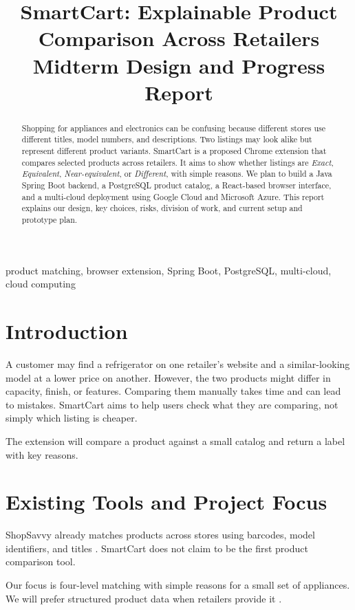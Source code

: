 \documentclass[conference,10pt]{IEEEtran}
\title{SmartCart: Explainable Product Comparison Across Retailers\\\large Midterm Design and Progress Report}
\author{\IEEEauthorblockN{Rishikesh Upadhyaya \quad Aayush Guragain \quad Diego Pe\~na Sadornil}
\IEEEauthorblockA{Department of Computer Science, Western Michigan University\\CS6030: Cloud Computing \quad Fall 2026 \quad November 8, 2026}}
\begin{document}
\maketitle
\begin{abstract}
Shopping for appliances and electronics can be confusing because different stores use different titles, model numbers, and descriptions. Two listings may look alike but represent different product variants. SmartCart is a proposed Chrome extension that compares selected products across retailers. It aims to show whether listings are \emph{Exact}, \emph{Equivalent}, \emph{Near-equivalent}, or \emph{Different}, with simple reasons. We plan to build a Java Spring Boot backend, a PostgreSQL product catalog, a React-based browser interface, and a multi-cloud deployment using Google Cloud and Microsoft Azure. This report explains our design, key choices, risks, division of work, and current setup and prototype plan.
\end{abstract}
\begin{IEEEkeywords}
product matching, browser extension, Spring Boot, PostgreSQL, multi-cloud, cloud computing
\end{IEEEkeywords}

\section{Introduction}
A customer may find a refrigerator on one retailer's website and a similar-looking model at a lower price on another. However, the two products might differ in capacity, finish, or features. Comparing them manually takes time and can lead to mistakes. SmartCart aims to help users check what they are comparing, not simply which listing is cheaper.

The extension will compare a product against a small catalog and return a label with key reasons.

\section{Existing Tools and Project Focus}
ShopSavvy already matches products across stores using barcodes, model identifiers, and titles \cite{shopsavvy}. SmartCart does not claim to be the first product comparison tool.

Our focus is four-level matching with simple reasons for a small set of appliances. We will prefer structured product data when retailers provide it \cite{googlevariants}.
\end{document}
